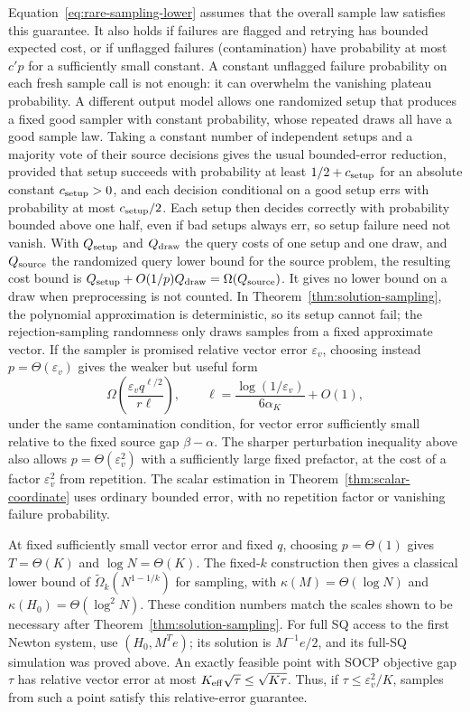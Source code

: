 Equation~\eqref{eq:rare-sampling-lower} assumes that the overall sample
law satisfies this guarantee.  It also holds if failures are flagged and
retrying has bounded expected cost, or if unflagged failures
(contamination) have probability at most $c'p$ for a sufficiently
small constant.  A constant unflagged failure probability on each
fresh sample call is not enough: it can overwhelm the vanishing plateau
probability.  A different output model allows one
randomized setup that produces a fixed good sampler with constant
probability, whose repeated draws all have a good sample law.  Taking a constant number of independent setups and a
majority vote of their source decisions gives the usual bounded-error
reduction, provided that setup succeeds with probability at least
$1/2+c_{\rm setup}$ for an absolute constant $c_{\rm setup}>0$, and each
decision conditional on a good setup errs with probability at most
$c_{\rm setup}/2$.  Each setup then decides correctly with probability bounded above one
half, even if bad setups always err, so setup failure need not vanish.
With $Q_{\rm setup}$ and $Q_{\rm draw}$ the query costs of one setup
and one draw, and $Q_{\rm source}$ the randomized query lower
bound for the source problem, the resulting cost bound is
$Q_{\rm setup}+O(1/p)Q_{\rm draw}=\Omega(Q_{\rm source})$.
It gives no lower bound on a draw when preprocessing is not counted.
In Theorem~\ref{thm:solution-sampling}, the polynomial approximation is
deterministic, so its setup cannot fail; the rejection-sampling
randomness only draws samples from a fixed approximate vector.
If the sampler is promised relative vector error $\varepsilon_v$,
choosing instead $p=\Theta(\varepsilon_v)$ gives the weaker but useful
form
\[
 \Omega\left(\frac{\varepsilon_v q^{\ell/2}}{r\ell}\right),\qquad
 \ell=\frac{\log(1/\varepsilon_v)}{6\alpha_K}+O(1),
\]
under the same contamination condition, for vector error sufficiently
small relative to the fixed source gap $\beta-\alpha$. The sharper perturbation
inequality above also allows $p=\Theta(\varepsilon_v^2)$ with a sufficiently
large fixed prefactor, at the cost of a factor $\varepsilon_v^2$ from
repetition.  The scalar estimation in Theorem~\ref{thm:scalar-coordinate}
uses ordinary bounded error, with no repetition factor or vanishing
failure probability.

At fixed sufficiently small vector error and fixed $q$, choosing
$p=\Theta(1)$ gives $T=\Theta(K)$ and $\log N=\Theta(K)$.
The fixed-$k$ construction then gives a classical lower bound of
$\widetilde\Omega_k(N^{1-1/k})$ for sampling, with
$\kappa(M)=\Theta(\log N)$ and
$\kappa(H_0)=\Theta(\log^2N)$.  These condition numbers match the scales
shown to be necessary after Theorem~\ref{thm:solution-sampling}.
For full SQ access to the first Newton system, use $(H_0,M^Te)$; its
solution is $M^{-1}e/2$, and its full-SQ simulation was proved above.
An exactly feasible point with SOCP objective gap $\tau$ has relative
vector error at most $K_{\rm eff}\sqrt\tau\leq\sqrt{K\tau}$.
Thus, if $\tau\leq\varepsilon_v^2/K$, samples from such a point satisfy
this relative-error guarantee.


